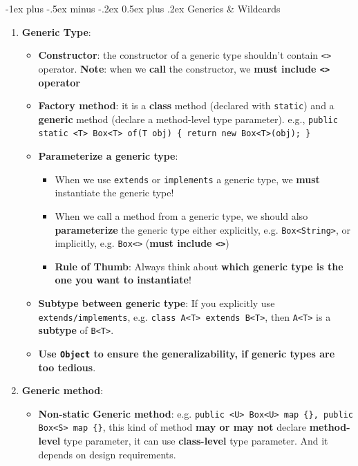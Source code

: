 \documentclass[10pt, landscape]{article}
\makeatletter
\renewcommand{\section}{\@startsection{section}{1}{0mm}%
                                {-1ex plus -.5ex minus -.2ex}%
                                {0.5ex plus .2ex}%
                                {\normalfont\large\bfseries}}
\makeatother
\begin{document}
\begin{multicols}{4}
\section{Generics \& Wildcards}
\begin{enumerate}
    \item \textbf{Generic Type}:
    \begin{itemize}
        \item \textbf{Constructor}: the constructor of a generic type shouldn't contain \texttt{<>} operator. \textbf{Note}: when we \textbf{call} the constructor, we \textbf{must include \texttt{<>} operator}
        \item \textbf{Factory method}: it is a \textbf{class} method (declared with \texttt{static}) and a \textbf{generic} method (declare a method-level type parameter). e.g., \texttt{public static <T> Box<T> of(T obj) \{ return new Box<T>(obj); \}}
        \item \textbf{Parameterize a generic type}:
        \begin{itemize}
            \item When we use \texttt{extends} or \texttt{implements} a generic type, we \textbf{must} instantiate the generic type!
            \item When we call a method from a generic type, we should also \textbf{parameterize} the generic type either explicitly, e.g. \texttt{Box<String>}, or implicitly, e.g. \texttt{Box<>} (\textbf{must include \texttt{<>}})
            \item \textbf{Rule of Thumb}: Always think about \textbf{which generic type is the one you want to instantiate}!
        \end{itemize}
        \item \textbf{Subtype between generic type}: If you explicitly use \texttt{extends/implements}, e.g. \texttt{class A<T> extends B<T>}, then \texttt{A<T>} is a \textbf{subtype} of \texttt{B<T>}.
        \item \textbf{Use \texttt{Object} to ensure the generalizability, if generic types are too tedious}.
    \end{itemize}
    \item \textbf{Generic method}:
    \begin{itemize}
        \item \textbf{Non-static Generic method}: e.g. \texttt{public <U> Box<U> map \{\}, public Box<S> map \{\}}, this kind of method \textbf{may or may not} declare \textbf{method-level} type parameter, it can use \textbf{class-level} type parameter. And it depends on design requirements.

\end{itemize}
\end{enumerate}
\end{multicols}
\end{document}
